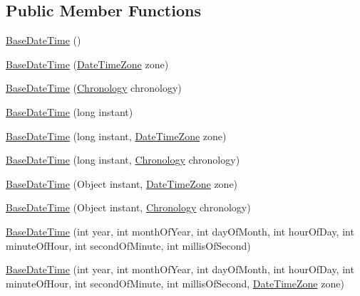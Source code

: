 \subsection*{Public Member Functions}
\begin{DoxyCompactItemize}
\item 
\hyperlink{classorg_1_1joda_1_1time_1_1base_1_1_base_date_time_a4a8554184637ab3c8c1c9a2416049b35}{Base\-Date\-Time} ()
\item 
\hyperlink{classorg_1_1joda_1_1time_1_1base_1_1_base_date_time_a9026d03c72462b607a64782f6391cc64}{Base\-Date\-Time} (\hyperlink{classorg_1_1joda_1_1time_1_1_date_time_zone}{Date\-Time\-Zone} zone)
\item 
\hyperlink{classorg_1_1joda_1_1time_1_1base_1_1_base_date_time_a641b850d49fed87a4ac795be9d7ecd93}{Base\-Date\-Time} (\hyperlink{classorg_1_1joda_1_1time_1_1_chronology}{Chronology} chronology)
\item 
\hyperlink{classorg_1_1joda_1_1time_1_1base_1_1_base_date_time_a17a10629b7db3aae3079deaf0961f531}{Base\-Date\-Time} (long instant)
\item 
\hyperlink{classorg_1_1joda_1_1time_1_1base_1_1_base_date_time_add9f5b1518cf3d8efa8b340859000868}{Base\-Date\-Time} (long instant, \hyperlink{classorg_1_1joda_1_1time_1_1_date_time_zone}{Date\-Time\-Zone} zone)
\item 
\hyperlink{classorg_1_1joda_1_1time_1_1base_1_1_base_date_time_a5e70ebdf4962ac61c848140bcf0bf2f5}{Base\-Date\-Time} (long instant, \hyperlink{classorg_1_1joda_1_1time_1_1_chronology}{Chronology} chronology)
\item 
\hyperlink{classorg_1_1joda_1_1time_1_1base_1_1_base_date_time_a4f43d07ad2acb2759ebe53d0931883ad}{Base\-Date\-Time} (Object instant, \hyperlink{classorg_1_1joda_1_1time_1_1_date_time_zone}{Date\-Time\-Zone} zone)
\item 
\hyperlink{classorg_1_1joda_1_1time_1_1base_1_1_base_date_time_afc8ef1538b01eecf08d20b1b4ad40aea}{Base\-Date\-Time} (Object instant, \hyperlink{classorg_1_1joda_1_1time_1_1_chronology}{Chronology} chronology)
\item 
\hyperlink{classorg_1_1joda_1_1time_1_1base_1_1_base_date_time_a8bffb10834e027849b3975b873ccbb61}{Base\-Date\-Time} (int year, int month\-Of\-Year, int day\-Of\-Month, int hour\-Of\-Day, int minute\-Of\-Hour, int second\-Of\-Minute, int millis\-Of\-Second)
\item 
\hyperlink{classorg_1_1joda_1_1time_1_1base_1_1_base_date_time_a9a5d50c99a1769ad96c7c335cafc7978}{Base\-Date\-Time} (int year, int month\-Of\-Year, int day\-Of\-Month, int hour\-Of\-Day, int minute\-Of\-Hour, int second\-Of\-Minute, int millis\-Of\-Second, \hyperlink{classorg_1_1joda_1_1time_1_1_date_time_zone}{Date\-Time\-Zone} zone)

\end{DoxyCompactItemize}
